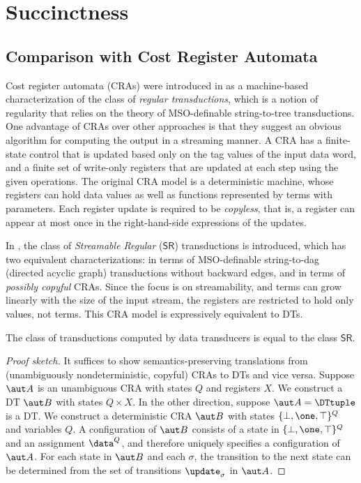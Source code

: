 \section{Succinctness}
\label{dt:sec:succinctness}

\subsection{Comparison with Cost Register Automata}
\label{dt:subsec:dts-and-cras}

\newcommand{\SR}{\mathsf{SR}}

Cost register automata (CRAs) were introduced in \cite{AdADRY2013CRA} as a machine-based characterization of the class of \emph{regular transductions}, which is a notion of regularity that relies on the theory of MSO-definable string-to-tree transductions. One advantage of CRAs over other approaches is that they suggest an obvious algorithm for computing the output in a streaming manner. A CRA has a finite-state control that is updated based only on the tag values of the input data word, and a finite set of write-only registers that are updated at each step using the given operations. The original CRA model is a deterministic machine, whose registers can hold data values as well as functions represented by terms with parameters. Each register update is required to be \emph{copyless}, that is, a register can appear at most once
in the right-hand-side expressions of the updates.

In \cite{arXiv2018}, the class of \emph{Streamable Regular} ($\SR$) transductions is introduced, which has two equivalent characterizations: in terms of MSO-definable string-to-dag (directed acyclic graph) transductions without backward edges, and in terms of \emph{possibly copyful} CRAs. Since the focus is on streamability, and terms can grow linearly with the size of the input stream, the registers are restricted to hold only values, not terms. This CRA model is expressively equivalent to DTs.

\begin{theorem}
\label{dt:thm:dt-expressiveness}
The class of transductions computed by data transducers is equal to the class $\SR$.
\end{theorem}
\begin{proof}[Proof sketch]
It suffices to show semantics-preserving translations from (unambiguously nondeterministic, copyful) CRAs to DTs and vice versa. Suppose $\aut A$ is an unambiguous CRA with states $Q$ and registers $X$. We construct a DT $\aut B$ with states $Q \times X$. In the other direction, suppose $\aut A = \DTtuple$ is a DT. We construct a deterministic CRA $\aut B$ with states $\{\bot,\one,\top\}^Q$ and variables $Q$. A configuration of $\aut B$ consists of a state in $\{\bot,\one,\top\}^Q$ and an assignment $\data^Q$, and therefore uniquely specifies a configuration of $\aut A$. For each state in $\aut B$ and each $\sigma$, the transition to the next state can be determined from the set of transitions $\update_\sigma$ in $\aut A$.
\end{proof}

